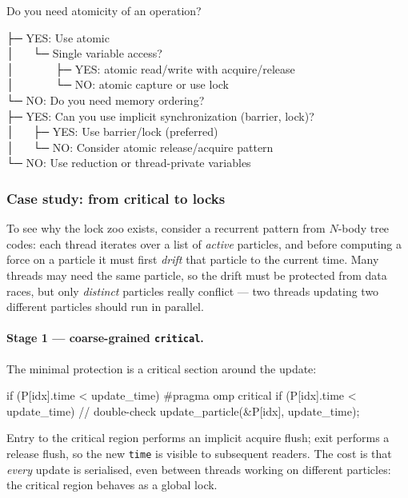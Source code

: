 \begin{tipsblock}
    Do you need atomicity of an operation?

    ├─ YES: Use atomic\\
    │ $\quad$ └─ Single variable access?\\
    │ $\qquad\quad$ ├─ YES: atomic read/write with acquire/release\\
    │ $\qquad\quad$ └─ NO: atomic capture or use lock\\
    └─ NO: Do you need memory ordering?\\
    \phantom{$\qquad$} ├─ YES: Can you use implicit synchronization (barrier, lock)?\\
    \phantom{$\qquad$} │ $\quad$ ├─ YES: Use barrier/lock (preferred)\\
    \phantom{$\qquad$} │ $\quad$ └─ NO: Consider atomic release/acquire pattern\\
    \phantom{$\qquad$} └─ NO: Use reduction or thread-private variables
\end{tipsblock}

\subsubsection{Case study: from critical to locks}

To see why the lock zoo exists, consider a recurrent pattern from $N$-body tree codes: each thread iterates over a list of \emph{active} particles, and before computing a force on a particle it must first \emph{drift} that particle to the current time. Many threads may need the same particle, so the drift must be protected from data races, but only \emph{distinct} particles really conflict --- two threads updating two different particles should run in parallel.

\paragraph{Stage 1 --- coarse-grained \texttt{critical}.} The minimal protection is a critical section around the update:

\begin{codeblock}[language = C, morekeywords={pragma}]
if (P[idx].time < update_time) {
    #pragma omp critical
    {
        if (P[idx].time < update_time)        // double-check
            update_particle(&P[idx], update_time);
    }
}
\end{codeblock}

Entry to the critical region performs an implicit acquire flush; exit performs a release flush, so the new \texttt{time} is visible to subsequent readers. The cost is that \emph{every} update is serialised, even between threads working on different particles: the critical region behaves as a global lock.

